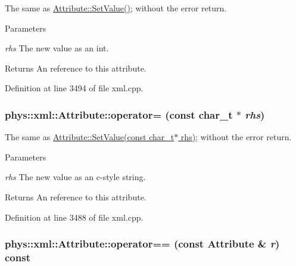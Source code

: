 The same as \hyperlink{classphys_1_1xml_1_1Attribute_a470512fcd8b4f7609319bf85df100aaa}{Attribute::SetValue()}; without the error return. 


\begin{DoxyParams}{Parameters}
\item[{\em rhs}]The new value as an int. \end{DoxyParams}
\begin{DoxyReturn}{Returns}
An reference to this attribute. 
\end{DoxyReturn}


Definition at line 3494 of file xml.cpp.

\hypertarget{classphys_1_1xml_1_1Attribute_a78d7a0436d386040e2d1f8954304b25b}{
\subsubsection[{operator=}]{\setlength{\rightskip}{0pt plus 5cm}phys::xml::Attribute::operator= (const char\_\-t $\ast$ {\em rhs})}}
\label{da/ddf/classphys_1_1xml_1_1Attribute_a78d7a0436d386040e2d1f8954304b25b}


The same as \hyperlink{classphys_1_1xml_1_1Attribute_a470512fcd8b4f7609319bf85df100aaa}{Attribute::SetValue(const char\_\-t$\ast$ rhs)}; without the error return. 


\begin{DoxyParams}{Parameters}
\item[{\em rhs}]The new value as an c-\/style string. \end{DoxyParams}
\begin{DoxyReturn}{Returns}
An reference to this attribute. 
\end{DoxyReturn}


Definition at line 3488 of file xml.cpp.

\hypertarget{classphys_1_1xml_1_1Attribute_a68b6ba1299cc9a2019ec97b10bb8978b}{
\subsubsection[{operator==}]{\setlength{\rightskip}{0pt plus 5cm}phys::xml::Attribute::operator== (const {\bf Attribute} \& {\em r}) const}}
\label{da/ddf/classphys_1_1xml_1_1Attribute_a68b6ba1299cc9a2019ec97b10bb8978b}


